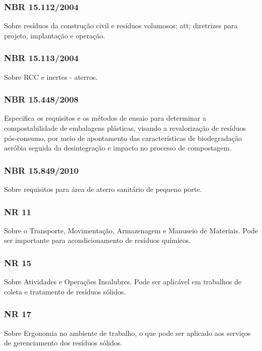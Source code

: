 \begin{subapend}
\begin{subsubapend}
		\subsubsection{NBR 15.112/2004}
		Sobre resíduos da construção civil e resíduos volumosos; \gls{att}; diretrizes para projeto, implantação e operação.
		\subsubsection{NBR 15.113/2004}
		Sobre RCC e inertes - aterros.
		\subsubsection{NBR 15.448/2008}
		Especifica os requisitos e os métodos de ensaio para determinar a compostabilidade de embalagens plásticas, visando a revalorização de resíduos pós-consumo, por meio de apontamento das características de biodegradação aeróbia seguida da desintegração e impacto no processo de compostagem.
		\subsubsection{NBR 15.849/2010}
		Sobre requisitos para área de aterro sanitário de pequeno porte. 
		\subsubsection{NR 11}
		Sobre o Transporte, Movimentação, Armazenagem e Manuseio de Materiais. Pode ser importante para acondicionamento de resíduos químicos.
		\subsubsection{NR 15}
		Sobre Atividades e Operações Insalubres. Pode ser aplicável em trabalhos de coleta e tratamento de resíduos sólidos.
		\subsubsection{NR 17}
		Sobre Ergonomia no ambiente de trabalho, o que pode ser aplicado aos serviços de gerenciamento dos resíduos sólidos.
	\end{subsubapend}
\end{subapend}


